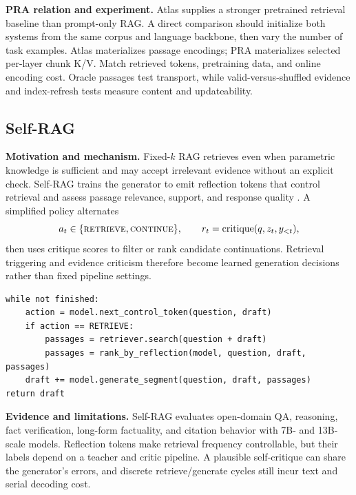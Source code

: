 \textbf{PRA relation and experiment.} Atlas supplies a stronger pretrained retrieval
baseline than prompt-only RAG. A direct comparison should initialize both systems from the
same corpus and language backbone, then vary the number of task examples. Atlas materializes
passage encodings; PRA materializes selected per-layer chunk K/V. Match retrieved tokens,
pretraining data, and online encoding cost. Oracle passages test transport, while
valid-versus-shuffled evidence and index-refresh tests measure content and updateability.

\subsection{Self-RAG}

\textbf{Motivation and mechanism.} Fixed-$k$ RAG retrieves even when parametric knowledge
is sufficient and may accept irrelevant evidence without an explicit check. Self-RAG trains
the generator to emit reflection tokens that control retrieval and assess passage relevance,
support, and response quality \citep{asai2024selfrag}. A simplified policy alternates
\begin{equation}
a_t\in\{\textsc{retrieve},\textsc{continue}\},\qquad
r_t=\operatorname{critique}(q,z_t,y_{<t}),
\end{equation}
then uses critique scores to filter or rank candidate continuations. Retrieval triggering
and evidence criticism therefore become learned generation decisions rather than fixed
pipeline settings.

\begin{lstlisting}[caption={Simplified adaptive retrieval and reflection loop}]
while not finished:
    action = model.next_control_token(question, draft)
    if action == RETRIEVE:
        passages = retriever.search(question + draft)
        passages = rank_by_reflection(model, question, draft, passages)
    draft += model.generate_segment(question, draft, passages)
return draft
\end{lstlisting}

\textbf{Evidence and limitations.} Self-RAG evaluates open-domain QA, reasoning, fact
verification, long-form factuality, and citation behavior with 7B- and 13B-scale models.
Reflection tokens make retrieval frequency controllable, but their labels depend on a
teacher and critic pipeline. A plausible self-critique can share the generator's errors,
and discrete retrieve/generate cycles still incur text and serial decoding cost.

